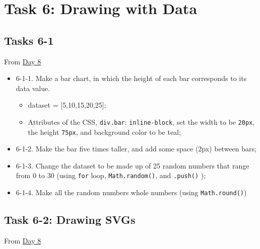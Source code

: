 \documentclass[
]{book}
\begin{document}
\hypertarget{task6}{%
\chapter{Task 6: Drawing with Data}\label{task6}}

\hypertarget{tasks-6-1}{%
\section{Tasks 6-1}\label{tasks-6-1}}

From \href{https://observablehq.com/@hongtaoh/spet-1-2020-day-eight}{Day 8}

\begin{itemize}
\item
  6-1-1. Make a bar chart, in which the height of each bar corresponds to its data value.

  \begin{itemize}
  \item
    dataset = {[}5,10,15,20,25{]};
  \item
    Attributes of the CSS, \texttt{div.bar}: \texttt{inline-block}, set the width to be \texttt{20px}, the height \texttt{75px}, and background color to be teal;
  \end{itemize}
\item
  6-1-2. Make the bar five times taller, and add some space (2px) between bars;
\item
  6-1-3. Change the dataset to be made up of 25 random numbers that range from 0 to 30 (using \texttt{for} loop, \texttt{Math.random()}, and \texttt{.push()} );
\item
  6-1-4. Make all the random numbers whole numbers (using \texttt{Math.round()})
\end{itemize}

\hypertarget{task-6-2-drawing-svgs}{%
\section{Task 6-2: Drawing SVGs}\label{task-6-2-drawing-svgs}}

From \href{https://observablehq.com/@hongtaoh/spet-1-2020-day-eight}{Day 8}
\end{document}
